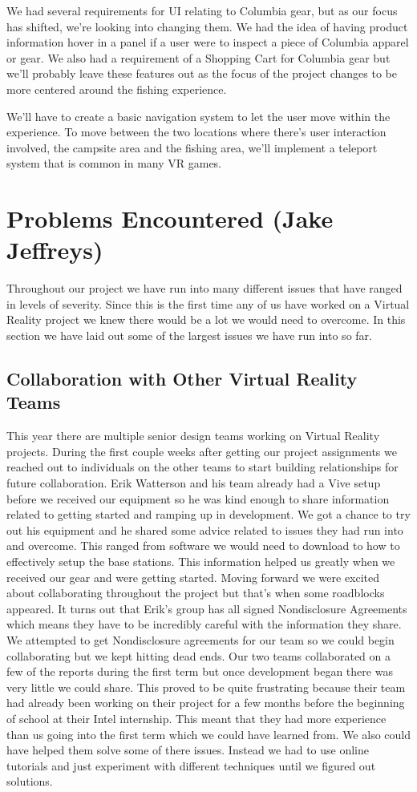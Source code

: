 \documentclass[10pt,journal,compsoc,onecolumn, draftclsnofoot]{IEEEtran}
\begin{document}
We had several requirements for UI relating to Columbia gear, but as our focus has shifted, we're looking into changing them. We had the idea of having product information hover in a panel if a user were to inspect a piece of Columbia apparel or gear. We also had a requirement of a Shopping Cart for Columbia gear but we'll probably leave these features out as the focus of the project changes to be more centered around the fishing experience.

We'll have to create a basic navigation system to let the user move within the experience. To move between the two locations where there's user interaction involved, the campsite area and the fishing area, we'll implement a teleport system that is common in many VR games.

\section{Problems Encountered (Jake Jeffreys)}
Throughout our project we have run into many different issues that have ranged in levels of severity.
Since this is the first time any of us have worked on a Virtual Reality project we knew there would be a lot we would need to overcome.
In this section we have laid out some of the largest issues we have run into so far.

\subsection{Collaboration with Other Virtual Reality Teams}
This year there are multiple senior design teams working on Virtual Reality projects.
During the first couple weeks after getting our project assignments we reached out to individuals on the other teams to start building relationships for future collaboration.
Erik Watterson and his team already had a Vive setup before we received our equipment so he was kind enough to share information related to getting started and ramping up in development.
We got a chance to try out his equipment and he shared some advice related to issues they had run into and overcome.
This ranged from software we would need to download to how to effectively setup the base stations.
This information helped us greatly when we received our gear and were getting started.
Moving forward we were excited about collaborating throughout the project but that’s when some roadblocks appeared.
It turns out that Erik’s group has all signed Nondisclosure Agreements which means they have to be incredibly careful with the information they share.
We attempted to get Nondisclosure agreements for our team so we could begin collaborating but we kept hitting dead ends.
Our two teams collaborated on a few of the reports during the first term but once development began there was very little we could share.
This proved to be quite frustrating because their team had already been working on their project for a few months before the beginning of school at their Intel internship.
This meant that they had more experience than us going into the first term which we could have learned from.
We also could have helped them solve some of there issues.
Instead we had to use online tutorials and just experiment with different techniques until we figured out solutions.
\end{document}
